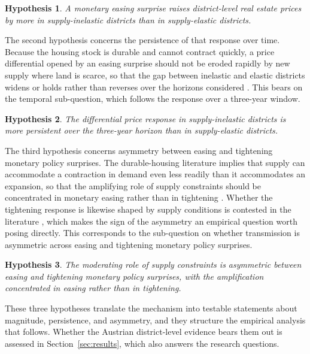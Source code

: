 \documentclass[a4paper,12pt, headsepline]{scrartcl}
\newtheorem{hyp}{Hypothesis}
\numberwithin{equation}{section}
\begin{document}
\begin{hyp}\label{hyp:magnitude}
	A monetary easing surprise raises district-level real estate prices by more in supply-inelastic districts than in supply-elastic districts.
\end{hyp}

The second hypothesis concerns the persistence of that response over time. Because the housing stock is durable and cannot contract quickly, a price differential opened by an easing surprise should not be eroded rapidly by new supply where land is scarce, so that the gap between inelastic and elastic districts widens or holds rather than reverses over the horizons considered \citep{glaeser2005}. This bears on the temporal sub-question, which follows the response over a three-year window.

\begin{hyp}\label{hyp:persistence}
	The differential price response in supply-inelastic districts is more persistent over the three-year horizon than in supply-elastic districts.
\end{hyp}

The third hypothesis concerns asymmetry between easing and tightening monetary policy surprises. The durable-housing literature implies that supply can accommodate a contraction in demand even less readily than it accommodates an expansion, so that the amplifying role of supply constraints should be concentrated in monetary easing rather than in tightening \citep{glaeser2005, aastveit2022}. Whether the tightening response is likewise shaped by supply conditions is contested in the literature \citep{albuquerque2024}, which makes the sign of the asymmetry an empirical question worth posing directly. This corresponds to the sub-question on whether transmission is asymmetric across easing and tightening monetary policy surprises.

\begin{hyp}\label{hyp:asymmetry}
	The moderating role of supply constraints is asymmetric between easing and tightening monetary policy surprises, with the amplification concentrated in easing rather than in tightening.
\end{hyp}

These three hypotheses translate the mechanism into testable statements about magnitude, persistence, and asymmetry, and they structure the empirical analysis that follows. Whether the Austrian district-level evidence bears them out is assessed in Section~\ref{sec:results}, which also answers the research questions.
\end{document}
